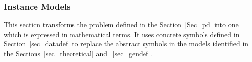 \documentclass[12pt]{article}
\newcommand{\colAwidth}{0.13\textwidth}
\newcommand{\colBwidth}{0.82\textwidth}
\newcounter{defnum} %
\newcounter{datadefnum} %
\newcommand{\ddref}[1]{DD\ref{#1}}
\newcommand{\tref}[1]{T\ref{#1}}
\newcommand{\gsref}[1]{GS\ref{#1}}
\newcommand{\iref}[1]{IM\ref{#1}}
\begin{document}


\subsubsection{Instance Models} \label{sec_instance}    

This section transforms the problem defined in the Section~\ref{Sec_pd} into 
one which is expressed in mathematical terms. It uses concrete symbols defined 
in Section~\ref{sec_datadef} to replace the abstract symbols in the models 
identified in the Sections~\ref{sec_theoretical} and ~\ref{sec_gendef}.

\end{document}
